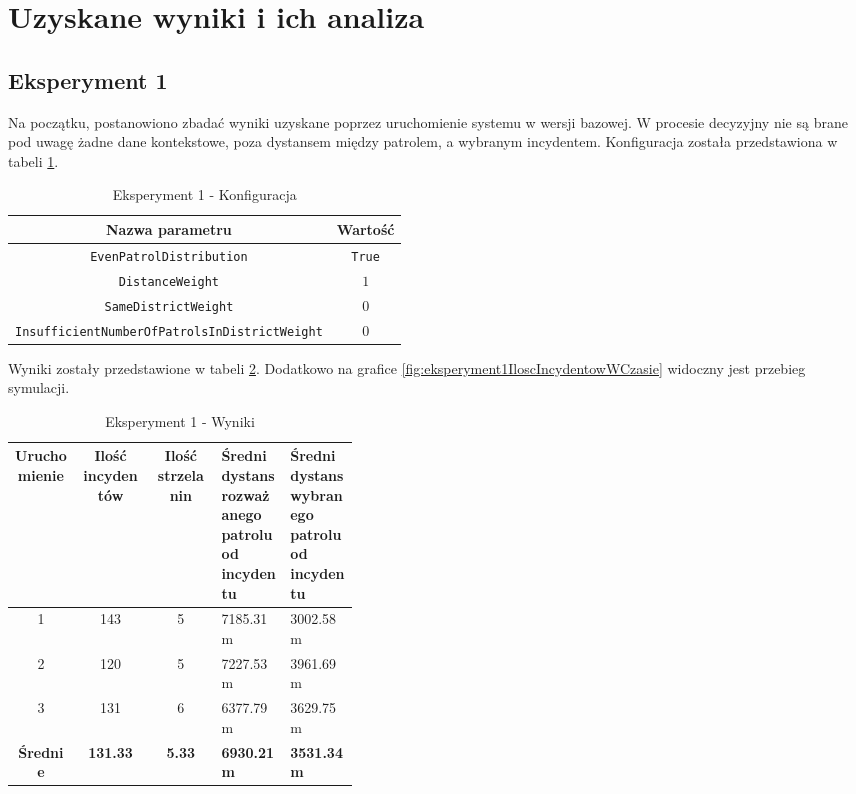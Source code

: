 \section{Uzyskane wyniki i ich analiza}

\subsection{Eksperyment 1}

\par Na początku, postanowiono zbadać wyniki uzyskane poprzez uruchomienie systemu w wersji bazowej. W procesie decyzyjny nie są brane pod uwagę żadne dane kontekstowe, poza dystansem między patrolem, a wybranym incydentem. Konfiguracja została przedstawiona w tabeli \ref{tab:eksperyment1Konfiguracja}.

\begin{table}[H]
    \centering
    \begin{tabular}{|c|c|}
        \hline
        Nazwa parametru & Wartość \\
        \hline
        \hline
         \texttt{EvenPatrolDistribution} & \texttt{True} \\
         \hline
         \texttt{DistanceWeight} & $1$ \\
         \hline
         \texttt{SameDistrictWeight} & $0$ \\
         \hline
         \texttt{InsufficientNumberOfPatrolsInDistrictWeight} & $0$ \\
         \hline
    \end{tabular}
    \caption{Eksperyment 1 - Konfiguracja}
    \label{tab:eksperyment1Konfiguracja}
\end{table}

Wyniki zostały przedstawione w tabeli \ref{tab:eksperyment1Wyniki}. Dodatkowo na grafice \ref{fig:eksperyment1IloscIncydentowWCzasie} widoczny jest przebieg symulacji.

\begin{table}[H]
    \centering
    \begin{tabular}{|c|c|c|p{0.2\linewidth}|p{0.2\linewidth}|}
        \hline
        Uruchomienie & Ilość incydentów & Ilość strzelanin & Średni dystans rozważanego patrolu od incydentu & Średni dystans wybranego patrolu od incydentu \\
        \hline
        \hline
        1 & 143 & 5 & 7185.31m & 3002.58m \\
        \hline
        2 & 120 & 5 & 7227.53m & 3961.69m \\
        \hline
        3 & 131 & 6 & 6377.79m & 3629.75m \\
        \hline
        \hline
        \textbf{Średnie} & \textbf{131.33} & \textbf{5.33} & \textbf{6930.21m} & \textbf{3531.34m} \\
        \hline
    \end{tabular}
    \caption{Eksperyment 1 - Wyniki}
    \label{tab:eksperyment1Wyniki}
\end{table}

